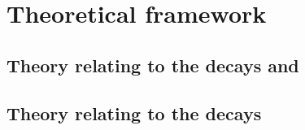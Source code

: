 \chapter{Theoretical framework}
\label{ch:theory}






\section[Introduction for the decays \btokpipimumu and \btophikmumu]{Theory relating to the
  decays \tmath{\btokpipimumu} and \tmath{\btophikmumu}}


\section[Introduction for the decay \bdsphi]{Theory relating to the
  decays \tmath{\btodsphi}}

